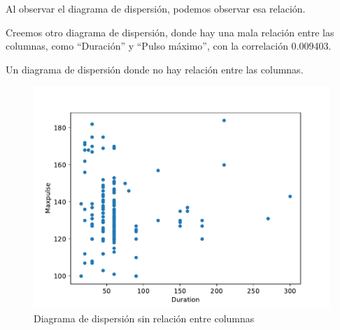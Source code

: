 Al observar el diagrama de dispersión, podemos observar esa relación.

Creemos otro diagrama de dispersión, donde hay una mala relación entre
las columnas, como ``Duración'' y ``Pulso máximo'', con la correlación
0.009403.\\

\begin{code} Un diagrama de dispersión donde no hay relación entre las columnas.

\begin{Shaded}
\begin{Highlighting}[]

\OperatorTok{=}\NormalTok{)}

\OperatorTok{=} \OperatorTok{=} \OperatorTok{=} \NormalTok{)}

\end{Highlighting}
\end{Shaded}

\begin{figure}
  \centering
  \includegraphics[scale=0.75]{img/grafica903.pdf}
  \caption{Diagrama de dispersión sin relación entre columnas}
\end{figure}
\end{code}

